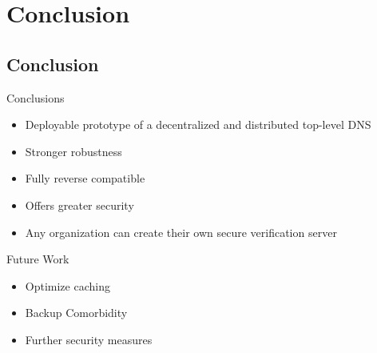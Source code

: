 \documentclass[11pt]{beamer}
\begin{document}
\section{Conclusion}



\subsection{Conclusion}
\begin{frame}{Conclusions}
	\begin{itemize}
		\item Deployable prototype of a decentralized and distributed top-level DNS
		\item Stronger robustness
		\item Fully reverse compatible
		\item Offers greater security
		\item Any organization can create their own secure verification server
		
	\end{itemize}
\end{frame}



\begin{frame}{Future Work}
	\begin{itemize}
		\item Optimize caching
		\item Backup Comorbidity 
		\item Further security measures
	\end{itemize}
\end{frame}



%
\end{document}
